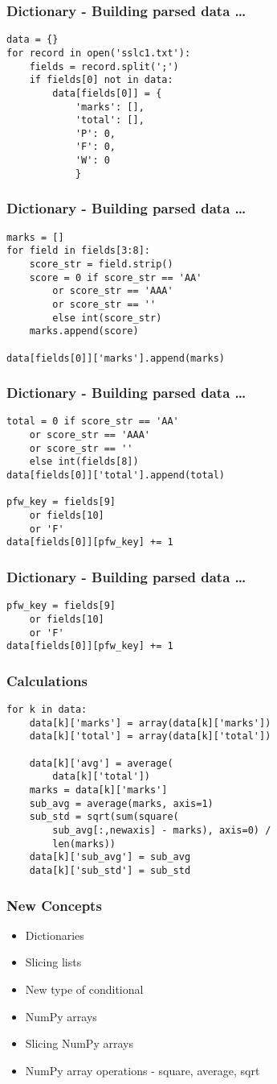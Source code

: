 \documentclass[14pt,compress]{beamer}
\begin{document}
\begin{frame}[fragile]
  \frametitle{Dictionary - Building parsed data \ldots}
  \small
  \begin{lstlisting}
data = {}
for record in open('sslc1.txt'):
    fields = record.split(';')
    if fields[0] not in data:
        data[fields[0]] = {
            'marks': [],
            'total': [],
            'P': 0,
            'F': 0,
            'W': 0
            }
  \end{lstlisting}
\end{frame}

\begin{frame}[fragile]
  \frametitle{Dictionary - Building parsed data \ldots}
  \begin{lstlisting}
marks = []
for field in fields[3:8]:
    score_str = field.strip()
    score = 0 if score_str == 'AA'
        or score_str == 'AAA'
        or score_str == ''
        else int(score_str)
    marks.append(score)

data[fields[0]]['marks'].append(marks)
  \end{lstlisting}
\end{frame}

\begin{frame}[fragile]
  \frametitle{Dictionary - Building parsed data \ldots}
  \begin{lstlisting}
total = 0 if score_str == 'AA'
    or score_str == 'AAA'
    or score_str == ''
    else int(fields[8])
data[fields[0]]['total'].append(total)

pfw_key = fields[9]
    or fields[10]
    or 'F'
data[fields[0]][pfw_key] += 1
  \end{lstlisting}
\end{frame}

\begin{frame}[fragile]
  \frametitle{Dictionary - Building parsed data \ldots}
  \begin{lstlisting}
pfw_key = fields[9]
    or fields[10]
    or 'F'
data[fields[0]][pfw_key] += 1
  \end{lstlisting}
\end{frame}

\begin{frame}[fragile]
  \frametitle{Calculations}
  \small
  \begin{lstlisting}
for k in data:
    data[k]['marks'] = array(data[k]['marks'])
    data[k]['total'] = array(data[k]['total'])

    data[k]['avg'] = average(
        data[k]['total'])
    marks = data[k]['marks']
    sub_avg = average(marks, axis=1)
    sub_std = sqrt(sum(square(
        sub_avg[:,newaxis] - marks), axis=0) /
        len(marks))
    data[k]['sub_avg'] = sub_avg
    data[k]['sub_std'] = sub_std
  \end{lstlisting}
\end{frame}

\begin{frame}[fragile]
  \frametitle{New Concepts}
  \begin{itemize}
   \item Dictionaries
   \item Slicing lists
   \item New type of conditional
   \item NumPy arrays
   \item Slicing NumPy arrays
   \item NumPy array operations - square, average, sqrt
  \end{itemize}
\end{frame}
\end{document}
